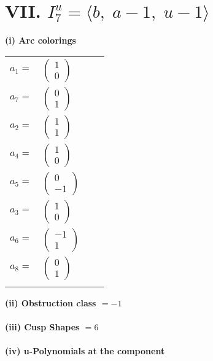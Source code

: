 \documentclass[1p]{elsarticle_modified}
\theoremstyle{definition}
\begin{document}
\centering \section*{VII. $I^u_{7}= \langle b,\;a-1,\;u-1 \rangle$}
\flushleft \textbf{(i) Arc colorings}\\
\begin{tabular}{m{7pt} m{180pt} m{7pt} m{180pt} }
\flushright $a_{1}=$&$\begin{pmatrix}1\\0\end{pmatrix}$ \\
\flushright $a_{7}=$&$\begin{pmatrix}0\\1\end{pmatrix}$ \\
\flushright $a_{2}=$&$\begin{pmatrix}1\\1\end{pmatrix}$ \\
\flushright $a_{4}=$&$\begin{pmatrix}1\\0\end{pmatrix}$ \\
\flushright $a_{5}=$&$\begin{pmatrix}0\\-1\end{pmatrix}$ \\
\flushright $a_{3}=$&$\begin{pmatrix}1\\0\end{pmatrix}$ \\
\flushright $a_{6}=$&$\begin{pmatrix}-1\\1\end{pmatrix}$ \\
\flushright $a_{8}=$&$\begin{pmatrix}0\\1\end{pmatrix}$\\&\end{tabular}
\flushleft \textbf{(ii) Obstruction class $= -1$}\\~\\
\flushleft \textbf{(iii) Cusp Shapes $= 6$}\\~\\
\newpage\renewcommand{\arraystretch}{1}
\flushleft \textbf{(iv) u-Polynomials at the component}\newline \\
\end{document}
